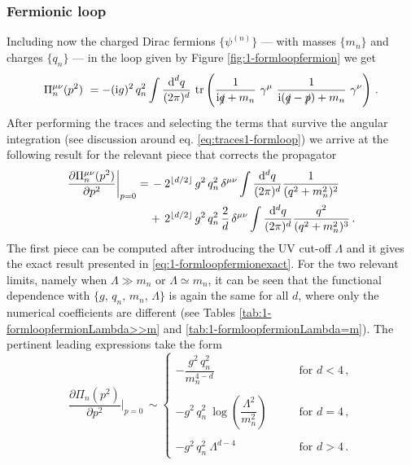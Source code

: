 \subsubsection*{Fermionic loop}
	
Including now the charged Dirac fermions $\{\psi^{(n)}\}$ --- with masses $\{m_n\}$ and charges $\{q_n\}$ --- in the loop given by Figure \ref{fig:1-formloopfermion} we get
%
\begin{equation}
		\Pi^{\mu\nu}_n(p^2) \ = - (\text{i} g)^2 \, q_n^2  \int \frac {\text{d}^dq}{(2\pi)^d}\ \text{tr} \left (\frac {1}{\text{i} \slashed{q}+m_n}\ \gamma^\mu \ \frac {1}{\text{i} (\slashed{q}-\slashed{p})+m_n} \ \gamma^\nu  \right)\, .
\end{equation}
%
After performing the traces and selecting the terms that survive the angular integration (see discussion around eq. \eqref{eq:traces1-formloop}) we arrive at the following result for the relevant piece that corrects the propagator
%
\begin{equation}\label{eq:1-formloopfermions2terms}
 \begin{aligned}
	\frac{\partial \Pi^{\mu \nu}_n(p^2)}{\partial p^2} \bigg\rvert_{p=0}  =& \, -2^{\lfloor d/2 \rfloor}\, g^2\,  q_n^2 \, \delta^{\mu\nu}  \int \dfrac{{\rm d}^d q}{(2\pi)^d} \dfrac{1}{(q^2+m_n^2)^2}\\
    & + \,  2^{\lfloor d/2 \rfloor}\,  g^2\,  q_n^2\,   \frac{2}{d} \, \delta^{\mu\nu}  \int \dfrac{{\rm d}^d q}{(2\pi)^d} \dfrac{q^2}{(q^2+m_n^2)^3}\, .
 \end{aligned}
\end{equation}
%
The first piece can be computed after introducing the UV cut-off $\Lambda$ and it gives the exact result presented in \eqref{eq:1-formloopfermionexact}. For the two relevant limits, namely when $\Lambda \gg m_n$ or $\Lambda \simeq m_n$, it can be seen that the functional dependence with $\{g,\, q_n,\, m_n,\, \Lambda\}$ is again the same for all $d$, where only the numerical coefficients are different (see Tables \ref{tab:1-formloopfermionLambda>>m} and \ref{tab:1-formloopfermionLambda=m}). The pertinent leading expressions take the form
%
\begin{equation}\label{eq:1-formloopfermionssummary}
		\frac {\partial \Pi_n(p^2)}{\partial p^2} \bigg\rvert_{p=0}\,   \sim 
		\left\{\begin{array}{lr}
			-  \dfrac{g^2\, q_n^2}{m_n^{4-d}} & \qquad\text{for } d< 4\, ,\\ \\ 
			-g^2\, q_n^2\ \log\left( \dfrac{\Lambda^2}{m_n^2}\right) &\qquad \text{for } d= 4\, ,\\ \\ 
			-g^2\, q_n^2\ \Lambda^{d-4}&\qquad \text{for } d>4\, .
		\end{array}\right.
\end{equation}

